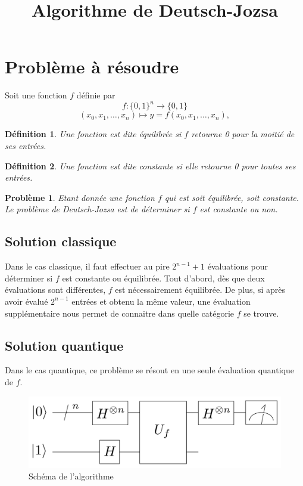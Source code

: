 \documentclass[12pt,a4paper]{article}
\title{Algorithme de Deutsch-Jozsa}
\date{}
\newtheorem{definition}{Définition}
\newtheorem{pb}{Problème}
\begin{document}
\maketitle

\section{Problème à résoudre}
Soit une fonction $f$ définie par 
\[
  f: \{0, 1\}^n \to \{ 0, 1 \} \]
\[ 
(x_0, x_1, \dots , x_n) \mapsto y = f(x_0, x_1, \dots , x_n), 
\]

\begin{definition}
  Une fonction est dite équilibrée si $f$ retourne 0 pour la moitié de ses entrées.
\end{definition}

\begin{definition}
  Une fonction est dite constante si elle retourne 0 pour toutes ses
  entrées.
\end{definition}


\begin{pb}
Etant donnée une fonction $f$ qui est soit équilibrée, soit constante.
Le problème de Deutsch-Jozsa est de déterminer si $f$ est constante ou
non.  
\end{pb}

\subsection{Solution classique}
Dans le cas classique, il faut effectuer au pire $2^{n-1}+1$
évaluations pour déterminer si $f$ est constante ou équilibrée. Tout
d'abord, dès que deux évaluations sont différentes, $f$ est
nécessairement équilibrée. De plus, si après avoir évalué $2^{n-1}$
entrées et obtenu la même valeur, une évaluation supplémentaire nous
permet de connaitre dans quelle catégorie $f$ se trouve.

\subsection{Solution quantique}
Dans le cas quantique, ce problème se résout en une seule évaluation
quantique de $f$.

\begin{figure}[htbp]
    \centering
    \includegraphics[scale=0.2]{Deutsch-Jozsa_Algorithm.png}
    \caption{Schéma de l'algorithme}
    \label{fig:univerise}
\end{figure}
\end{document}
